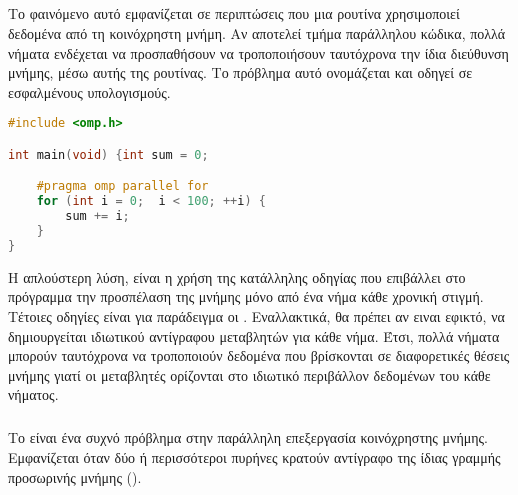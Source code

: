 \paragraph{}
\begin{center}
	\begin{minipage}[t]{0.45\linewidth}
\subparagraph{}
	Το φαινόμενο αυτό εμφανίζεται σε περιπτώσεις που μια ρουτίνα χρησιμοποιεί δεδομένα από τη κοινόχρηστη μνήμη. Αν
αποτελεί τμήμα παράλληλου κώδικα, πολλά νήματα ενδέχεται να προσπαθήσουν να τροποποιήσουν ταυτόχρονα την ίδια διεύθυνση
μνήμης, μέσω αυτής της ρουτίνας. Το πρόβλημα αυτό ονομάζεται \emph{} και οδηγεί σε εσφαλμένους
υπολογισμούς. 
	\end{minipage}
	\qquad
	\begin{minipage}[t]{0.47\linewidth}
\begin{spacing}{1.1}
\begin{lstlisting}[tabsize=2, basicstyle=\small, language=C++, caption={\el{Παράδειγμα} race condition}, frame=tb]
#include <omp.h>

int main(void) {int sum = 0;

	#pragma omp parallel for
	for (int i = 0;  i < 100; ++i) {
		sum += i;		
	}
}
\end{lstlisting}
\end{spacing}
	\end{minipage}
\end{center}
\par
Η απλούστερη λύση, είναι η χρήση της κατάλληλης οδηγίας που επιβάλλει στο πρόγραμμα την προσπέλαση της
μνήμης μόνο από ένα νήμα κάθε χρονική στιγμή. Τέτοιες οδηγίες είναι για παράδειγμα οι \emph{}. Εναλλακτικά, θα πρέπει αν ειναι εφικτό, να δημιουργείται ιδιωτικού αντίγραφου μεταβλητών για κάθε
νήμα. Έτσι, πολλά νήματα μπορούν ταυτόχρονα να τροποποιούν δεδομένα που βρίσκονται σε διαφορετικές θέσεις μνήμης γιατί
οι μεταβλητές ορίζονται στο ιδιωτικό περιβάλλον δεδομένων του κάθε νήματος.
\clearpage
\paragraph{}
\subparagraph{}
Το \emph{} είναι ένα συχνό πρόβλημα στην παράλληλη επεξεργασία κοινόχρηστης μνήμης. Εμφανίζεται όταν
δύο ή περισσότεροι πυρήνες κρατούν αντίγραφο της ίδιας γραμμής προσωρινής μνήμης (\emph{}). 

